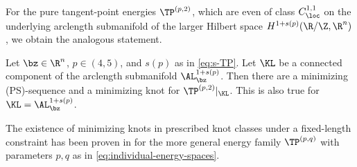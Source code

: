 For the pure  tangent-point energies $\TP^{(p,2)}$,
which are even
of class $C^{1,1}_\loc$ on 
 the underlying arclength submanifold of the larger Hilbert space $H^{1+s(p)}
 (\R/\Z,\R^n)$,
we obtain the analogous statement.


\begin{corollary}
\label{cor:minimizing-knots-TP}
Let $\bz\in\R^n$, $p\in (4,5)$, and $s(p)$ as in \cref{eq:s-TP}.
Let $\KL$ be a connected component of the arclength submanifold $\AL^{1+s(p)}_\bz$.
Then there are a minimizing {\rm (PS)}-sequence and a minimizing knot for $\TP^{(p,2)}|_{\KL}$.
This is also true for $\KL = \AL^{1+s(p)}_\bz$.
\end{corollary}
The existence of minimizing knots in prescribed knot classes
under a fixed-length constraint
has been proven in \cite[Theorem 1.3]{blatt-reiter_2015a} for the 
more general energy family
$\TP^{(p,q)}$ with parameters $p,q$ as in \cref{eq:individual-energy-spaces}.

